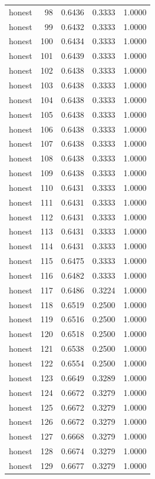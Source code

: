 \begin{tabular}{lrrrr}
honest & 98 & 0.6436 & 0.3333 & 1.0000 \\
honest & 99 & 0.6432 & 0.3333 & 1.0000 \\
honest & 100 & 0.6434 & 0.3333 & 1.0000 \\
honest & 101 & 0.6439 & 0.3333 & 1.0000 \\
honest & 102 & 0.6438 & 0.3333 & 1.0000 \\
honest & 103 & 0.6438 & 0.3333 & 1.0000 \\
honest & 104 & 0.6438 & 0.3333 & 1.0000 \\
honest & 105 & 0.6438 & 0.3333 & 1.0000 \\
honest & 106 & 0.6438 & 0.3333 & 1.0000 \\
honest & 107 & 0.6438 & 0.3333 & 1.0000 \\
honest & 108 & 0.6438 & 0.3333 & 1.0000 \\
honest & 109 & 0.6438 & 0.3333 & 1.0000 \\
honest & 110 & 0.6431 & 0.3333 & 1.0000 \\
honest & 111 & 0.6431 & 0.3333 & 1.0000 \\
honest & 112 & 0.6431 & 0.3333 & 1.0000 \\
honest & 113 & 0.6431 & 0.3333 & 1.0000 \\
honest & 114 & 0.6431 & 0.3333 & 1.0000 \\
honest & 115 & 0.6475 & 0.3333 & 1.0000 \\
honest & 116 & 0.6482 & 0.3333 & 1.0000 \\
honest & 117 & 0.6486 & 0.3224 & 1.0000 \\
honest & 118 & 0.6519 & 0.2500 & 1.0000 \\
honest & 119 & 0.6516 & 0.2500 & 1.0000 \\
honest & 120 & 0.6518 & 0.2500 & 1.0000 \\
honest & 121 & 0.6538 & 0.2500 & 1.0000 \\
honest & 122 & 0.6554 & 0.2500 & 1.0000 \\
honest & 123 & 0.6649 & 0.3289 & 1.0000 \\
honest & 124 & 0.6672 & 0.3279 & 1.0000 \\
honest & 125 & 0.6672 & 0.3279 & 1.0000 \\
honest & 126 & 0.6672 & 0.3279 & 1.0000 \\
honest & 127 & 0.6668 & 0.3279 & 1.0000 \\
honest & 128 & 0.6674 & 0.3279 & 1.0000 \\
honest & 129 & 0.6677 & 0.3279 & 1.0000 \\

\end{tabular}
